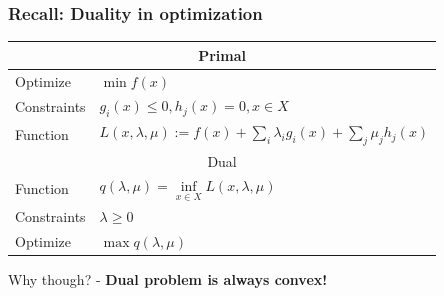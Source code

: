 \documentclass{beamer}
\begin{document}
\begin{frame}
\frametitle{Recall: Duality in optimization}





\end{frame}

\begin{frame}
\begin{tabular}{ll}
\toprule[1.5pt]
\multicolumn{2}{c}{Primal}\\\midrule
Optimize&$\min f(x)$\\\midrule
Constraints&$g_i(x)\le0, h_j(x)=0, x\in X$\\\midrule
Function&$L(x,\lambda,\mu):=f(x)+\sum_i\lambda_i g_i(x)+\sum_j\mu_j h_j(x)$\\\midrule
\multicolumn{2}{c}{Dual}\\\midrule
Function&$q(\lambda,\mu)=\inf\limits_{x\in X} L(x,\lambda,\mu)$\\\midrule
Constraints&$\lambda\ge0$\\\midrule
Optimize&$\max q(\lambda,\mu)$\\\midrule
\end{tabular}
\vspace{15pt}

Why though? - \textbf{Dual problem is always convex!}

\end{frame}
\end{document}
